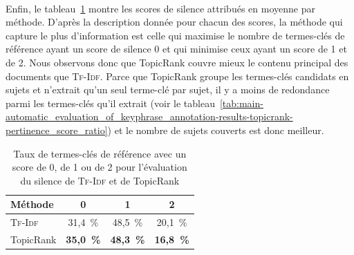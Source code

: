         ~\\Enfin, le
        tableau~\ref{tab:main-automatic_evaluation_of_keyphrase_annotation-results-topicrank-silence_score_ratio}
        montre les scores de silence attribués en moyenne par méthode. D'après
        la description donnée pour chacun des scores, la méthode qui capture le
        plus d'information est celle qui maximise le nombre de termes-clés de
        référence ayant un score de silence 0 et qui minimise ceux ayant un
        score de 1 et de 2. Nous observons donc que TopicRank couvre mieux le
        contenu principal des documents que \textsc{Tf-Idf}. Parce que TopicRank
        groupe les termes-clés candidats en sujets et n'extrait qu'un seul
        terme-clé par sujet, il y a moins de redondance parmi les termes-clés
        qu'il extrait (voir le
        tableau~\ref{tab:main-automatic_evaluation_of_keyphrase_annotation-results-topicrank-pertinence_score_ratio})
        et le nombre de sujets couverts est donc meilleur.
        \begin{table}[h!]
          \centering
          \begin{tabular}{l|c|c|c}
            \toprule
            \textbf{Méthode} & \textbf{0} & \textbf{1} & \textbf{2}\\
            \hline
            \textsc{Tf-Idf} & 31,4~\% & 48,5~\% & 20,1~\%\\
            TopicRank & \textbf{35,0~\%} & \textbf{48,3~\%} & \textbf{16,8~\%}\\
            \bottomrule
          \end{tabular}
          \caption{Taux de termes-clés de référence avec un score de 0, de 1 ou
                   de 2 pour l'évaluation du silence de \textsc{Tf-Idf} et de
                   TopicRank
                   \label{tab:main-automatic_evaluation_of_keyphrase_annotation-results-topicrank-silence_score_ratio}}
        \end{table}

